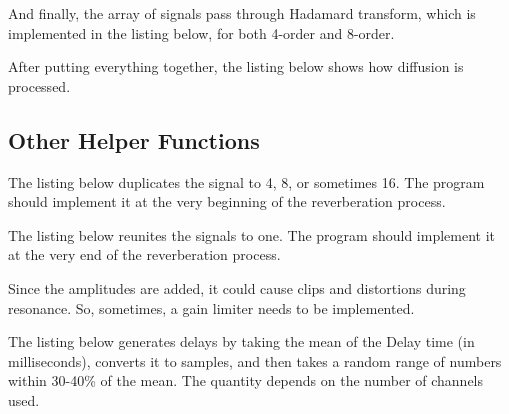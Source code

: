 

And finally, the array of signals pass through Hadamard transform, which is implemented in the listing below,
for both 4-order and 8-order.


After putting everything together, the listing below shows how diffusion is processed.



\subsection{Other Helper Functions}

The listing below duplicates the signal to 4, 8, or sometimes 16. The program should implement it
at the very beginning of the reverberation process.


The listing below reunites the signals to one. The program should implement it
at the very end of the reverberation process.


Since the amplitudes are added, it could cause clips and distortions during resonance.
So, sometimes, a gain limiter needs to be implemented.

The listing below generates delays by taking the mean of the Delay time (in milliseconds),
converts it to samples, and then takes a random range of numbers within 30-40\% of the mean.
The quantity depends on the number of channels used.



